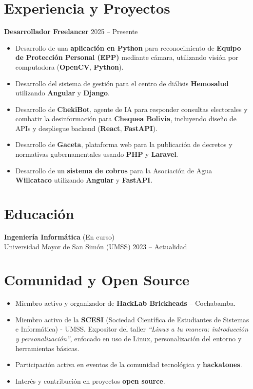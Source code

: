\documentclass[11pt,a4paper]{article}
\begin{document}
	\section*{Experiencia y Proyectos}
	\textbf{Desarrollador Freelancer} \hfill 2025 -- Presente
	\begin{itemize}[leftmargin=*]
		\item Desarrollo de una \textbf{aplicación en Python} para reconocimiento de \textbf{Equipo de Protección Personal (EPP)} mediante cámara, utilizando visión por computadora (\textbf{OpenCV}, \textbf{Python}).
		\item Desarrollo del sistema de gestión para el centro de diálisis \textbf{Hemosalud} utilizando \textbf{Angular} y \textbf{Django}.
		\item Desarrollo de \textbf{ChekiBot}, agente de IA para responder consultas electorales y combatir la desinformación para \textbf{Chequea Bolivia}, incluyendo diseño de APIs y despliegue backend (\textbf{React}, \textbf{FastAPI}).
		\item Desarrollo de \textbf{Gaceta}, plataforma web para la publicación de decretos y normativas gubernamentales usando \textbf{PHP} y \textbf{Laravel}.
		\item Desarrollo de un \textbf{sistema de cobros} para la Asociación de Agua \textbf{Willcataco} utilizando \textbf{Angular} y \textbf{FastAPI}.
	\end{itemize}
	
	\section*{Educación}
	\textbf{Ingeniería Informática} (En curso) \\
	Universidad Mayor de San Simón (UMSS) \hfill 2023 -- Actualidad
	
	\section*{Comunidad y Open Source}
	\begin{itemize}[leftmargin=*]
		\item Miembro activo y organizador de \textbf{HackLab Brickheads} -- Cochabamba.
		\item Miembro activo de la \textbf{SCESI} (Sociedad Científica de Estudiantes de Sistemas e Informática) - UMSS.
				Expositor del taller \textit{``Linux a tu manera: introducción y personalización''}, enfocado en uso de Linux, personalización del entorno y herramientas básicas.
			
		\item Participación activa en eventos de la comunidad tecnológica y \textbf{hackatones}.
		\item Interés y contribución en proyectos \textbf{open source}.
	\end{itemize}
	
\end{document}
